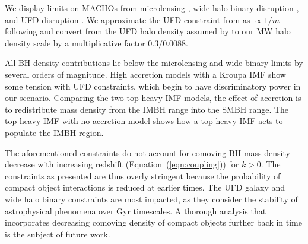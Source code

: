 \documentclass[twocolumn,twocolappendix]{aastex631}
\begin{document}
\begin{appendix}
We display limits on MACHOs from microlensing \citep[e.g.][]{blaineau2022mulensing}, wide halo binary disruption \citep[e.g.][]{tylerwidebinary2022, monroyallen2014widehalo}, and UFD disruption \citep[e.g.][]{brandt16}.
We approximate the UFD constraint from \citet{brandt16} as $\propto 1/m$ following \citet[][Eqn.~(7.104)]{binney2011galactic} and convert from the UFD halo density assumed by \citet[][Figure~4]{brandt16} to our MW halo density scale by a multiplicative factor $0.3/0.0088$. 

All BH density contributions lie below the microlensing and wide binary limits by several orders of magnitude.
High accretion models with a Kroupa IMF show some tension with UFD constraints, which begin to have discriminatory power in our scenario.
Comparing the two top-heavy IMF models, the effect of accretion is to redistribute mass density from the IMBH range into the SMBH range.
The top-heavy IMF with no accretion model shows how a top-heavy IMF acts to populate the IMBH region.

The aforementioned constraints do not account for comoving BH mass density decrease with increasing redshift (Equation~(\ref{eqn:coupling})) for $k > 0$.
The constraints as presented are thus overly stringent because the probability of compact object interactions is reduced at earlier times.
The UFD galaxy and wide halo binary constraints are most impacted, as they consider the stability of astrophysical phenomena over Gyr timescales.
A thorough analysis that incorporates decreasing comoving density of compact objects further back in time is the subject of future work.

\end{appendix}

{}

\end{document}

